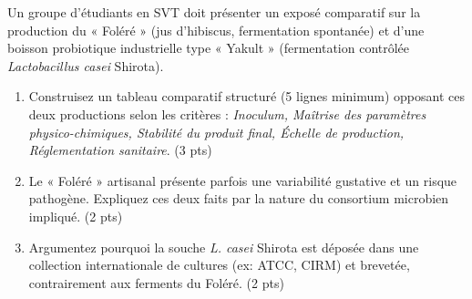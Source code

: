 \documentclass[11pt]{article}
\begin{document}
\begin{exercice}
Un groupe d'étudiants en SVT doit présenter un exposé comparatif sur la production du « Foléré » (jus d'hibiscus, fermentation spontanée) et d'une boisson probiotique industrielle type « Yakult » (fermentation contrôlée \textit{Lactobacillus casei} Shirota).

\begin{enumerate}
    \item Construisez un tableau comparatif structuré (5 lignes minimum) opposant ces deux productions selon les critères : \textit{Inoculum, Maîtrise des paramètres physico-chimiques, Stabilité du produit final, Échelle de production, Réglementation sanitaire}. (3 pts)
    \item Le « Foléré » artisanal présente parfois une variabilité gustative et un risque pathogène. Expliquez ces deux faits par la nature du consortium microbien impliqué. (2 pts)
    \item Argumentez pourquoi la souche \textit{L. casei} Shirota est déposée dans une collection internationale de cultures (ex: ATCC, CIRM) et brevetée, contrairement aux ferments du Foléré. (2 pts)
\end{enumerate}
\end{exercice}
\end{document}
